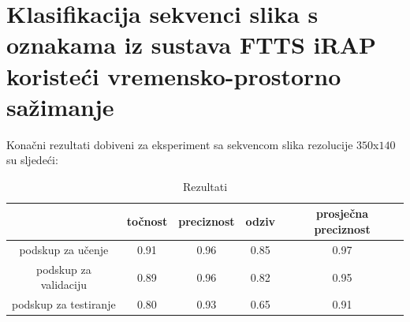 \documentclass[times, utf8, diplomski, numeric]{fer}
\begin{document}
\section{Klasifikacija sekvenci slika s oznakama iz sustava FTTS iRAP koristeći vremensko-prostorno sažimanje}
Konačni rezultati dobiveni za eksperiment sa sekvencom slika rezolucije $350$x$140$ su sljedeći:
\begin{table}[H]
\centering
\caption{Rezultati}
\label{score:pooling}
\begin{tabular}{c|c|c|c|c|}
\cline{2-5}
                                            & točnost & preciznost & odziv & prosječna preciznost \\ \hline
\multicolumn{1}{|c|}{podskup za učenje}     & 0.91       & 0.96        & 0.85     &           0.97           \\ \hline
\multicolumn{1}{|c|}{podskup za validaciju} & 0.89       & 0.96        & 0.82     &            0.95          \\ \hline
\multicolumn{1}{|c|}{podskup za testiranje} & 0.80       & 0.93        & 0.65     &            0.91          \\ \hline
\end{tabular}
\end{table}
\end{document}
